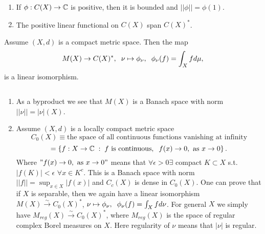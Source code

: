 \begin{lemma}
    $\quad$
    \begin{enumerate}
        \item If $\phi:C(X)\rightarrow \mathbb{C}$ is positive, then it is bounded and $||\phi|| = \phi(1)$.
        \item The positive linear functional on $C(X)$ span $C(X)^*$.
    \end{enumerate}
\end{lemma}

\begin{theorem}
    Assume $(X,d)$ is a compact metric space. Then the map 
    \[M(X)\rightarrow C(X)^*,\hspace{2mm} \nu\mapsto \phi_\nu,\hspace{2mm} \phi_\nu(f) = \int_X fd\mu,\]
    is a linear isomorphism.
\end{theorem}

\begin{remark}
    $\quad$
    \begin{enumerate}
        \item As a byproduct we see that $M(X)$ is a Banach space with norm $||\nu|| = |\nu|(X)$.
        \item Assume $(X,d)$ is a locally compact metric space 
        \[C_0(X) \equiv \text{the space of all continuous functions vanishing at infinity}\]
        \[ = \left\{f:X\rightarrow \mathbb{C} \hspace{1mm}:\hspace{1mm} f \text{ is continuous},\hspace{2mm} f(x)\rightarrow 0,\text{ as }x\rightarrow 0\right\}.\]
        Where $"f(x)\rightarrow 0,\text{ as }x\rightarrow 0"$ means that $\forall \epsilon>0\exists$ compact $K\subset X$ s.t. $|f(K)|<\epsilon$ $\forall x\in K^c$.
        This is a Banach space with norm $||f|| = \sup_{x\in X}|f(x)|$ and $C_c(X)$ is dense in $C_0(X)$.
        One can prove that if $X$ is separable, then we again have a linear isomorphism $M(X)\xrightarrow{\sim} C_0(X)^*$, $\nu\mapsto \phi_\nu,\hspace{2mm} \phi_\nu(f)=\int_X fd\nu$.
        For general $X$ we simply have $M_{reg}(X)\xrightarrow{\sim}C_0(X)^*$, where $M_{reg}(X)$ is the space of regular complex Borel measures on $X$. Here regularity of $\nu$ means that $|\nu|$ is regular.
    \end{enumerate}
\end{remark}